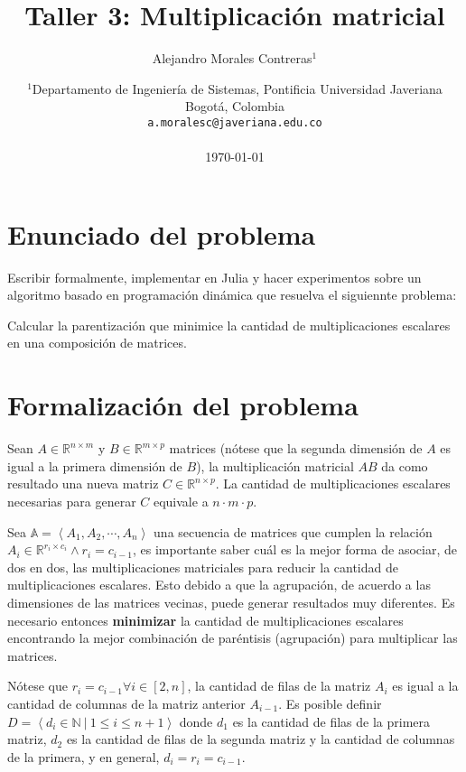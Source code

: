 \documentclass[letter]{article}
\title{Taller 3: Multiplicación matricial}
\author{Alejandro Morales Contreras$^1$}
\date{
	$^1$Departamento de Ingeniería de Sistemas, Pontificia Universidad Javeriana\\Bogotá,  Colombia \\
	\texttt{a.moralesc@javeriana.edu.co}\\~\\
	\today
}
\begin{document}
\maketitle

\tableofcontents

\section{Enunciado del problema} \label{enunciado}

Escribir formalmente, implementar en Julia y hacer experimentos sobre un algoritmo basado en programación dinámica que resuelva el siguiennte problema: \par

Calcular la parentización que minimice la cantidad de multiplicaciones escalares en una composición de matrices. \par

\section{Formalización del problema} \label{formalizacion}

Sean $A \in \mathbb{R}^{n \times m}$ y $B \in \mathbb{R}^{m \times p}$ matrices (nótese que la segunda dimensión de $A$ es igual a la primera dimensión de $B$), la multiplicación matricial $A B$ da como resultado una nueva matriz $C \in \mathbb{R}^{n \times p}$. La cantidad de multiplicaciones escalares necesarias para generar $C$ equivale a $n \cdotp m \cdotp p$. \par

Sea $\mathbb{A}=\left< A_1, A_2, \cdots, A_n \right>$ una secuencia de matrices que cumplen la relación $A_i \in \mathbb{R}^{r_i \times c_i} \land r_i = c_{i-1}$, es importante saber cuál es la mejor forma de asociar, de dos en dos, las multiplicaciones matriciales para reducir la cantidad de multiplicaciones escalares. Esto debido a que la agrupación, de acuerdo a las dimensiones de las matrices vecinas, puede generar resultados muy diferentes. Es necesario entonces \textbf{minimizar} la cantidad de multiplicaciones escalares encontrando la mejor combinación de paréntisis (agrupación) para multiplicar las matrices. \par

Nótese que $r_i = c_{i-1} \forall i \in [2, n]$, la cantidad de filas de la matriz $A_i$ es igual a la cantidad de columnas de la matriz anterior $A_{i-1}$. Es posible definir $D=\left< d_i \in \mathbb{N} ~|~ 1 \leq i \leq n + 1 \right>$ donde $d_1$ es la cantidad de filas de la primera matriz, $d_2$ es la cantidad de filas de la segunda matriz y la cantidad de columnas de la primera, y en general, $d_i = r_i = c_{i-1}$.
\end{document}
